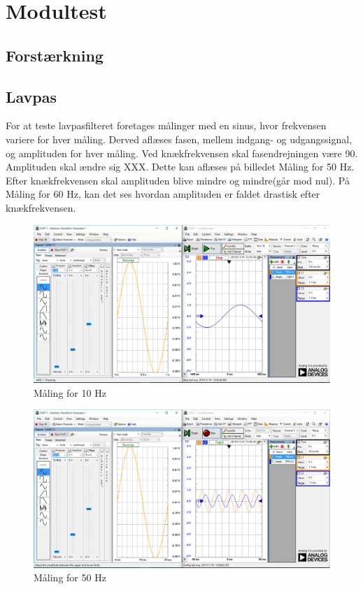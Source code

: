 \section{Modultest}
\subsection{Forstærkning}
\subsection{Lavpas}
For at teste lavpasfilteret foretages målinger med en sinus, hvor frekvensen variere for hver måling. Derved aflæses fasen, mellem indgang- og udgangssignal, og amplituden for hver måling. 
Ved knækfrekvensen skal fasendrejningen være 90\textdegree. Amplituden skal ændre sig XXX. Dette kan aflæses på billedet Måling for 50 Hz.
Efter knækfrekvensen skal amplituden blive mindre og mindre(går mod nul). På Måling for 60 Hz, kan det ses hvordan amplituden er faldet drastisk efter knækfrekvensen.  
\begin{figure}[htb]
	\centering
	\includegraphics[width=1.0\textwidth]{Figurer/10Hz}
	\caption{Måling for 10 Hz}
	\label{fig:maeling10Hz}
\end{figure}

\begin{figure}[htb]
	\centering
	\includegraphics[width=1.0\textwidth]{Figurer/50Hz}
	\caption{Måling for 50 Hz}
	\label{fig:maeling50Hz}
\end{figure}

